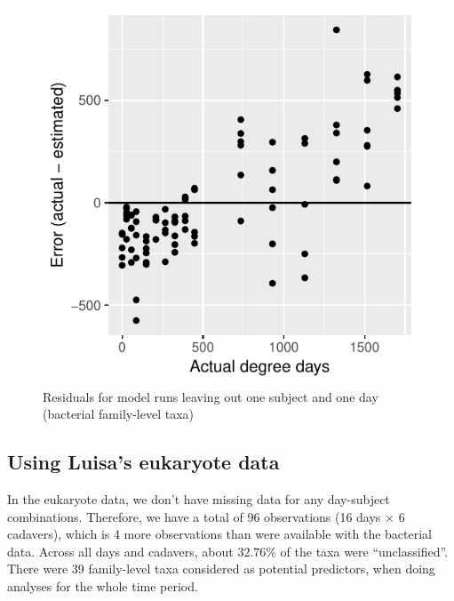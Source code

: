 \documentclass{article}
\begin{document}
\begin{figure}
  \centering
  \includegraphics{../revise_algorithm/only_families/all_time_steps/hit_1perc_twice/leave_out_one_subj_and_one_day_residuals}
  \caption{Residuals for model runs leaving out one subject and one day (bacterial family-level taxa)}
  \label{fig:leave_one_out_resids_bac_family_taxa}
\end{figure}


\subsection{Using Luisa's eukaryote data}

In the eukaryote data, we don't have missing data for any day-subject
combinations.  Therefore, we have a total of 96 observations (16 days
$\times$ 6 cadavers), which is 4 more observations than were available
with the bacterial data.  Across all days and cadavers, about 32.76\%
of the taxa were ``unclassified''.  There were 39 family-level taxa
considered as potential predictors, when doing analyses for the whole
time period.
\end{document}
